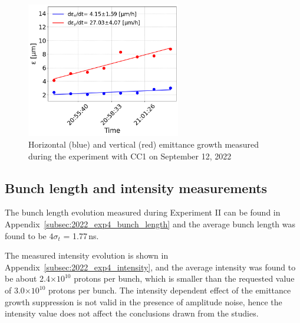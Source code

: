 

\begin{figure}[!h]
   \centering         
   \includegraphics[width=0.6\textwidth]{images/Ch8/cc_md_sep22_AN_coast12.png}
       \caption{Horizontal (blue) and vertical (red) emittance growth measured during the experiment with CC1 on September 12, 2022}
       \label{fig:H_V_emit_growth_Amplitude_noise_coast12}
\end{figure}



\subsection{Bunch length and intensity measurements}\label{subsec:bunch_length_intensity_exp4}


The bunch length evolution measured during Experiment II can be found in Appendix~\ref{subsec:2022_exp4_bunch_length} and the average bunch length was found to be $4\sigma_t$ = 1.77\,ns.

The measured intensity evolution is shown in Appendix~\ref{subsec:2022_exp4_intensity}, and the average intensity was found to be about  2.4$\times 10^{10}$ protons per bunch, which is smaller than the requested value of 3.0$\times 10^{10}$ protons per bunch. The intensity dependent effect of the emittance growth suppression is not valid in the presence of amplitude noise, hence the intensity value does not affect the conclusions drawn from the studies. 


